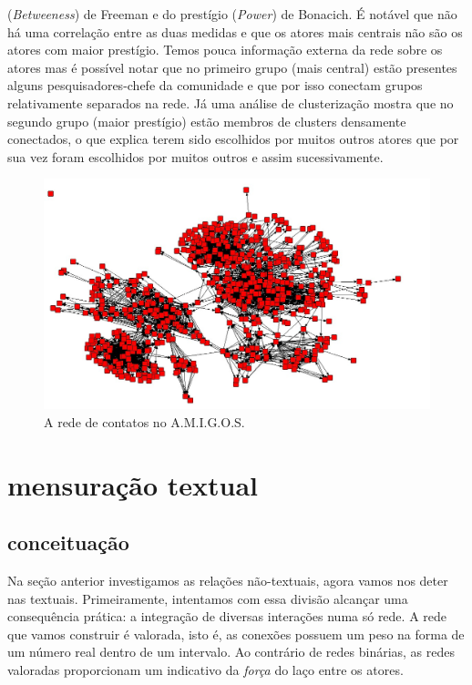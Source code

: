\documentclass{article}
\begin{document}
\begin{table}[htbp]
\begin{boxedminipage}{\textwidth}
(\textit{Betweeness}) de Freeman e do prestígio (\textit{Power}) de Bonacich.
É notável que não há uma correlação entre as duas medidas e que os atores mais
centrais não são os atores com maior prestígio. Temos pouca informação externa
da rede sobre os atores mas é possível notar que no primeiro grupo (mais
central) estão presentes alguns pesquisadores-chefe da comunidade e que por isso
conectam grupos relativamente separados na rede. Já uma análise de clusterização
mostra que no segundo grupo (maior prestígio) estão membros de clusters
densamente conectados, o que explica terem sido escolhidos por muitos outros
atores que por sua vez foram escolhidos por muitos outros e assim
sucessivamente.

	\end{boxedminipage}
\end{table}
\clearpage
\begin{figure}[h!]
  \caption{A rede de contatos no A.M.I.G.O.S.}
  \centering
    \includegraphics[width=\textwidth]{imgs/amigos-contatos.jpg}
\end{figure}

\section{mensuração textual}
\subsection{conceituação}
Na seção anterior investigamos as relações não-textuais, agora vamos nos deter
nas textuais. Primeiramente, intentamos com essa divisão alcançar uma
consequência prática: a integração de diversas interações numa só rede. A rede
que vamos construir é valorada, isto é, as conexões possuem um peso na forma de
um número real dentro de um intervalo. Ao contrário de redes binárias, as redes
valoradas proporcionam um indicativo da \textit{força} do laço entre os atores.
\end{document}
